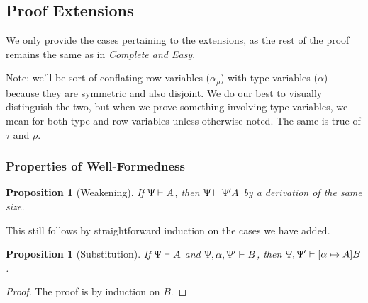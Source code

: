 \documentclass{article}
\newtheorem{prop}[thm]{Proposition}
\newcommand{\declCtx}{\Uppsi}
\newcommand{\rcd}[1]{\{#1\}}
\newcommand{\rowall}{\rotatebox[origin=c]{180}{\(\mathsf{R}\)}}
\newcommand{\rowvar}{\alpha_\rho}
\newcommand{\wf}[2]{#1 \vdash #2}
\begin{document}
\subsection{Proof Extensions}

We only provide the cases pertaining to the extensions, as the rest of the proof
remains the same as in \textit{Complete and Easy}.

Note: we'll be sort of conflating row variables (\(\rowvar\)) with type
variables (\(\alpha\)) because they are symmetric and also disjoint. We do our
best to visually distinguish the two, but when we prove something involving type
variables, we mean for both type and row variables unless otherwise noted. The
same is true of \(\tau\) and \(\rho\).

\subsubsection{Properties of Well-Formedness}
\begin{prop}[Weakening]
  If \(\wf \declCtx A\), then \(\wf \declCtx {\declCtx'} A\) by a derivation of
  the same size.
\end{prop}

This still follows by straightforward induction on the cases we have added.

\begin{prop}[Substitution]
  If \(\wf \declCtx A\) and \(\wf {\declCtx, \alpha, \declCtx'} B\), then \(\wf
  {\declCtx, \declCtx'} {[\alpha \mapsto A] B}\).
\end{prop}

\begin{proof}
The proof is by induction on \(B\).
\end{proof}
\end{document}
